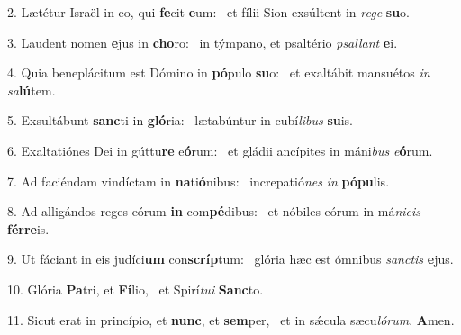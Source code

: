 2. Lætétur Israël in eo, qui \textbf{fe}cit \textbf{e}um: \ast\  et fílii Sion exsúltent in \textit{re}\textit{ge} \textbf{su}o.\

3. Laudent nomen \textbf{e}jus in \textbf{cho}ro: \ast\  in týmpano, et psaltério \textit{psal}\textit{lant} \textbf{e}i.\

4. Quia beneplácitum est Dómino in \textbf{pó}pulo \textbf{su}o: \ast\  et exaltábit mansuétos \textit{in} \textit{sa}\textbf{lú}tem.\

5. Exsultábunt \textbf{sanc}ti in \textbf{gló}ria: \ast\  lætabúntur in cubí\textit{li}\textit{bus} \textbf{su}is.\

6. Exaltatiónes Dei in gúttu\textbf{re} e\textbf{ó}rum: \ast\  et gládii ancípites in máni\textit{bus} \textit{e}\textbf{ó}rum.\

7. Ad faciéndam vindíctam in \textbf{na}ti\textbf{ó}nibus: \ast\  increpatió\textit{nes} \textit{in} \textbf{pó}\textbf{pu}lis.\

8. Ad alligándos reges eórum \textbf{in} com\textbf{pé}dibus: \ast\  et nóbiles eórum in má\textit{ni}\textit{cis} \textbf{fér}\textbf{re}is.\

9. Ut fáciant in eis judíci\textbf{um} con\textbf{scríp}tum: \ast\  glória hæc est ómnibus \textit{sanc}\textit{tis} \textbf{e}jus.\

10. Glória \textbf{Pa}tri, et \textbf{Fí}lio, \ast\  et Spirí\textit{tu}\textit{i} \textbf{Sanc}to.\

11. Sicut erat in princípio, et \textbf{nunc}, et \textbf{sem}per, \ast\  et in sǽcula sæcu\textit{ló}\textit{rum}. \textbf{A}men.\


